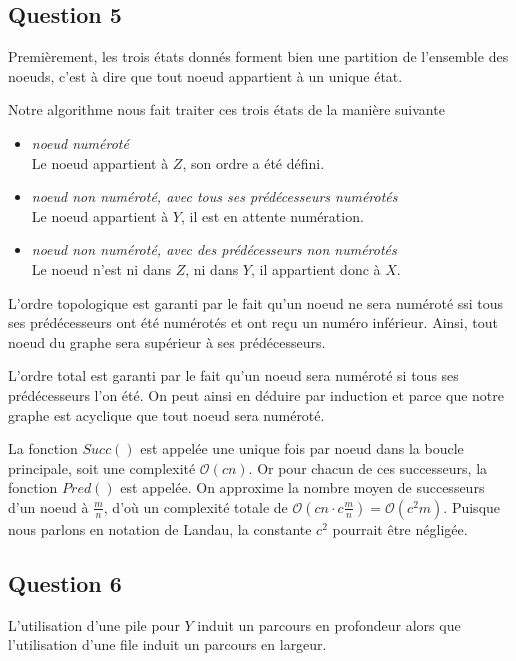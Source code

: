 \documentclass[11pt]{article}
\begin{document}
  \subsection{Question 5}
    Premièrement, les trois états donnés forment bien une partition de
    l'ensemble des noeuds, c'est à dire que tout noeud appartient à un unique
    état.

    Notre algorithme nous fait traiter ces trois états de la manière suivante
    \begin{itemize}
      \item \emph{noeud numéroté} \\
        Le noeud appartient à $Z$, son ordre a été défini.
      \item \emph{noeud non numéroté, avec tous ses prédécesseurs numérotés} \\
        Le noeud appartient à $Y$, il est en attente numération.
      \item \emph{noeud non numéroté, avec des prédécesseurs non numérotés} \\
        Le noeud n'est ni dans $Z$, ni dans $Y$, il appartient donc à $X$.
    \end{itemize}

    L'ordre topologique est garanti par le fait qu'un noeud ne sera numéroté ssi
    tous ses prédécesseurs ont été numérotés et ont reçu un numéro inférieur.
    Ainsi, tout noeud du graphe sera supérieur à ses prédécesseurs.

    L'ordre total est garanti par le fait qu'un noeud sera numéroté si tous ses
    prédécesseurs l'on été. On peut ainsi en déduire par induction et parce que
    notre graphe est acyclique que tout noeud sera numéroté.

    La fonction $Succ()$ est appelée une unique fois par noeud dans la boucle
    principale, soit une complexité $\mathcal{O}(c n)$. Or pour chacun de ces
    successeurs, la fonction $Pred()$ est appelée. On approxime la nombre moyen
    de successeurs d'un noeud à $\frac{m}{n}$, d'où un complexité totale de
    $\mathcal{O}(c n \cdot c \frac{m}{n}) = \mathcal{O}(c^2 m)$. Puisque nous
    parlons en notation de Landau, la constante $c^2$ pourrait être négligée.

  \subsection{Question 6}
    L'utilisation d'une pile pour $Y$ induit un parcours en profondeur alors que
    l'utilisation d'une file induit un parcours en largeur.
\end{document}
